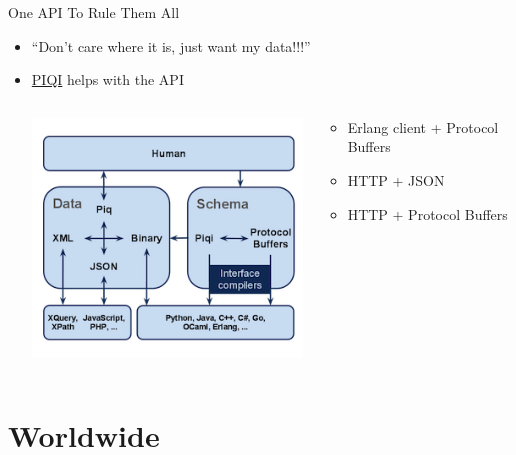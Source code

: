 \documentclass[aspectratio=43]{beamer}
\begin{document}
\begin{frame}{One API To Rule Them All}
    \begin{itemize}
        \item ``Don't care where it is, just want my data!!!''
        \pause
        \item \href{http://piqi.org}{PIQI} helps with the API
        \begin{columns}
            \begin{column}[c]{0.3\textwidth}
                \includegraphics[width=\textwidth]{images/piqi.png}
            \end{column}
            \begin{column}[c]{0.6\textwidth}
                \begin{itemize}
                    \item Erlang client + Protocol Buffers
                    \item HTTP + JSON
                    \item HTTP + Protocol Buffers
                \end{itemize}
            \end{column}
        \end{columns}
    \end{itemize}
\end{frame}

\section{Worldwide}
\end{document}
